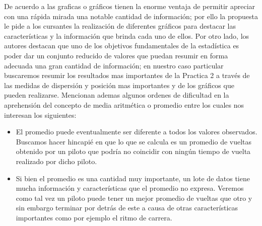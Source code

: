 De acuerdo a \textcite{bressan08} las graficas o gráficos tienen la enorme ventaja de permitir apreciar con una rápida mirada una notable cantidad de información; por ello la propuesta le pide a los cursantes la realización de diferentes gráficos para destacar las características y la información que brinda cada uno de ellos. Por otro lado, los autores destacan que uno de los objetivos fundamentales de la estadística es poder dar un conjunto reducido de valores que puedan resumir en forma adecuada una gran cantidad de información; en nuestro caso particular buscaremos resumir los resultados mas importantes de la Practica 2 a través de las medidas de dispersión y posición mas importantes y de los gráficos que pueden realizarse. Mencionan ademas algunos ordenes de dificultad en la aprehensión del concepto de media aritmética o promedio entre los cuales nos interesan los siguientes:
\begin{itemize}
	\item El promedio puede eventualmente ser diferente a todos los valores observados. Buscamos hacer hincapié en que lo que se calcula es un promedio de vueltas obtenido por un piloto que podría no coincidir con ningún tiempo de vuelta realizado por dicho piloto.
	\item Si bien el promedio es una cantidad muy importante, un lote de datos tiene mucha información y características que el promedio no expresa. Veremos como tal vez un piloto puede tener un mejor promedio de vueltas que otro y sin embargo terminar por detrás de este a causa de otras características importantes como por ejemplo el ritmo de carrera.
\end{itemize}


